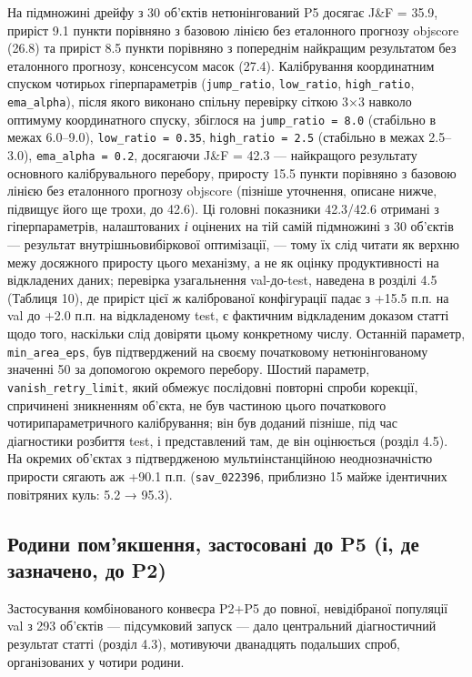 \documentclass[11pt]{article}
\begin{document}
На підмножині дрейфу з 30 об'єктів нетюнінгований P5 досягає J\&F = 35.9, приріст 9.1 пункти порівняно з базовою лінією без еталонного прогнозу objscore (26.8) та приріст 8.5 пункти порівняно з попереднім найкращим результатом без еталонного прогнозу, консенсусом масок (27.4). Калібрування координатним спуском чотирьох гіперпараметрів (\texttt{jump\_ratio}, \texttt{low\_ratio}, \texttt{high\_ratio}, \texttt{ema\_alpha}), після якого виконано спільну перевірку сіткою 3×3 навколо оптимуму координатного спуску, збіглося на \texttt{jump\_ratio = 8.0} (стабільно в межах 6.0--9.0), \texttt{low\_ratio = 0.35}, \texttt{high\_ratio = 2.5} (стабільно в межах 2.5--3.0), \texttt{ema\_alpha = 0.2}, досягаючи J\&F = 42.3 --- найкращого результату основного калібрувального перебору, приросту 15.5 пункти порівняно з базовою лінією без еталонного прогнозу objscore (пізніше уточнення, описане нижче, підвищує його ще трохи, до 42.6). Ці головні показники 42.3/42.6 отримані з гіперпараметрів, налаштованих \emph{і} оцінених на тій самій підмножині з 30 об'єктів --- результат внутрішньовибіркової оптимізації, --- тому їх слід читати як верхню межу досяжного приросту цього механізму, а не як оцінку продуктивності на відкладених даних; перевірка узагальнення val-до-test, наведена в розділі 4.5 (Таблиця 10), де приріст цієї ж каліброваної конфігурації падає з +15.5 п.п. на val до +2.0 п.п. на відкладеному test, є фактичним відкладеним доказом статті щодо того, наскільки слід довіряти цьому конкретному числу. Останній параметр, \texttt{min\_area\_eps}, був підтверджений на своєму початковому нетюнінгованому значенні 50 за допомогою окремого перебору. Шостий параметр, \texttt{vanish\_retry\_limit}, який обмежує послідовні повторні спроби корекції, спричинені зникненням об'єкта, не був частиною цього початкового чотирипараметричного калібрування; він був доданий пізніше, під час діагностики розбиття test, і представлений там, де він оцінюється (розділ 4.5). На окремих об'єктах з підтвердженою мультиінстанційною неоднозначністю прирости сягають аж +90.1 п.п. (\texttt{sav\_022396}, приблизно 15 майже ідентичних повітряних куль: 5.2 → 95.3).

\subsection{Родини пом'якшення, застосовані до P5 (і, де зазначено, до P2)}

Застосування комбінованого конвеєра P2+P5 до повної, невідібраної популяції val з 293 об'єктів --- підсумковий запуск --- дало центральний діагностичний результат статті (розділ 4.3), мотивуючи дванадцять подальших спроб, організованих у чотири родини.
\end{document}

